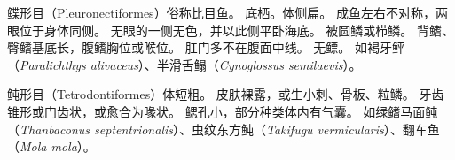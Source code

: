 \documentclass[11pt]{article}
\begin{document}
\newline

鲽形目（Pleuronectiformes）俗称比目鱼。
底栖。体侧扁。
成鱼左右不对称，两眼位于身体同侧。
无眼的一侧无色，并以此侧平卧海底。
被圆鳞或栉鳞。
背鳍、臀鳍基底长，腹鳍胸位或喉位。
肛门多不在腹面中线。
无鳔。
如褐牙鲆（\textit{Paralichthys alivaceus}）、半滑舌鳎（\textit{Cynoglossus semilaevis}）。

\newline

鲀形目（Tetrodontiformes）体短粗。
皮肤裸露，或生小刺、骨板、粒鳞。
牙齿锥形或门齿状，或愈合为喙状。
鳃孔小，部分种类体内有气囊。
如绿鳍马面鲀（\textit{Thanbaconus septentrionalis}）、虫纹东方鲀（\textit{Takifugu vermicularis}）、翻车鱼（\textit{Mola mola}）。
\end{document}
